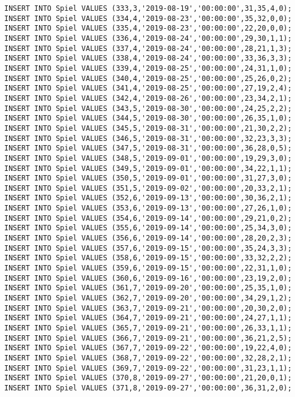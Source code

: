 \documentclass{lehramt-informatik-aufgabe}
\begin{document}
\begin{verbatim}
INSERT INTO Spiel VALUES (333,3,'2019-08-19','00:00:00',31,35,4,0);
INSERT INTO Spiel VALUES (334,4,'2019-08-23','00:00:00',35,32,0,0);
INSERT INTO Spiel VALUES (335,4,'2019-08-23','00:00:00',22,20,0,0);
INSERT INTO Spiel VALUES (336,4,'2019-08-24','00:00:00',29,30,1,1);
INSERT INTO Spiel VALUES (337,4,'2019-08-24','00:00:00',28,21,1,3);
INSERT INTO Spiel VALUES (338,4,'2019-08-24','00:00:00',33,36,3,3);
INSERT INTO Spiel VALUES (339,4,'2019-08-25','00:00:00',24,31,1,0);
INSERT INTO Spiel VALUES (340,4,'2019-08-25','00:00:00',25,26,0,2);
INSERT INTO Spiel VALUES (341,4,'2019-08-25','00:00:00',27,19,2,4);
INSERT INTO Spiel VALUES (342,4,'2019-08-26','00:00:00',23,34,2,1);
INSERT INTO Spiel VALUES (343,5,'2019-08-30','00:00:00',24,25,2,2);
INSERT INTO Spiel VALUES (344,5,'2019-08-30','00:00:00',26,35,1,0);
INSERT INTO Spiel VALUES (345,5,'2019-08-31','00:00:00',21,30,2,2);
INSERT INTO Spiel VALUES (346,5,'2019-08-31','00:00:00',32,23,3,3);
INSERT INTO Spiel VALUES (347,5,'2019-08-31','00:00:00',36,28,0,5);
INSERT INTO Spiel VALUES (348,5,'2019-09-01','00:00:00',19,29,3,0);
INSERT INTO Spiel VALUES (349,5,'2019-09-01','00:00:00',34,22,1,1);
INSERT INTO Spiel VALUES (350,5,'2019-09-01','00:00:00',31,27,3,0);
INSERT INTO Spiel VALUES (351,5,'2019-09-02','00:00:00',20,33,2,1);
INSERT INTO Spiel VALUES (352,6,'2019-09-13','00:00:00',30,36,2,1);
INSERT INTO Spiel VALUES (353,6,'2019-09-13','00:00:00',27,26,1,0);
INSERT INTO Spiel VALUES (354,6,'2019-09-14','00:00:00',29,21,0,2);
INSERT INTO Spiel VALUES (355,6,'2019-09-14','00:00:00',25,34,3,0);
INSERT INTO Spiel VALUES (356,6,'2019-09-14','00:00:00',28,20,2,3);
INSERT INTO Spiel VALUES (357,6,'2019-09-15','00:00:00',35,24,3,3);
INSERT INTO Spiel VALUES (358,6,'2019-09-15','00:00:00',33,32,2,2);
INSERT INTO Spiel VALUES (359,6,'2019-09-15','00:00:00',22,31,1,0);
INSERT INTO Spiel VALUES (360,6,'2019-09-16','00:00:00',23,19,2,0);
INSERT INTO Spiel VALUES (361,7,'2019-09-20','00:00:00',25,35,1,0);
INSERT INTO Spiel VALUES (362,7,'2019-09-20','00:00:00',34,29,1,2);
INSERT INTO Spiel VALUES (363,7,'2019-09-21','00:00:00',20,30,2,0);
INSERT INTO Spiel VALUES (364,7,'2019-09-21','00:00:00',24,27,1,1);
INSERT INTO Spiel VALUES (365,7,'2019-09-21','00:00:00',26,33,1,1);
INSERT INTO Spiel VALUES (366,7,'2019-09-21','00:00:00',36,21,2,5);
INSERT INTO Spiel VALUES (367,7,'2019-09-22','00:00:00',19,22,4,0);
INSERT INTO Spiel VALUES (368,7,'2019-09-22','00:00:00',32,28,2,1);
INSERT INTO Spiel VALUES (369,7,'2019-09-22','00:00:00',31,23,1,1);
INSERT INTO Spiel VALUES (370,8,'2019-09-27','00:00:00',21,20,0,1);
INSERT INTO Spiel VALUES (371,8,'2019-09-27','00:00:00',36,31,2,0);

\end{verbatim}
\end{document}
